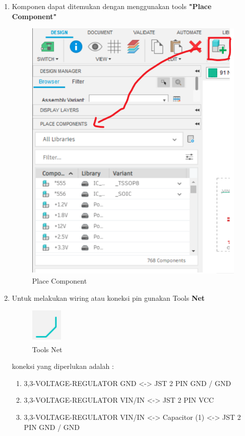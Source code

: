 \begin{enumerate}
    \vspace{5pt}
    \item Komponen dapat ditemukan dengan menggunakan tools \textbf{"Place Component"}
        \begin{figure}[H]
            \centering
            \includegraphics[width=0.7\linewidth]{P1/img/placecomponent.png}
            \caption{Place Component} 
            \label{fig:libraryfusion360}
        \end{figure}
    \item Untuk melakukan wiring atau koneksi pin gunakan Tools \textbf{Net} 
        \begin{figure}[H]
            \centering
            \includegraphics[width=0.2\linewidth]{P1/img/net.png}
            \caption{Tools Net} 
            \label{fig:toolsnet}
        \end{figure}
    koneksi yang diperlukan adalah :
    \begin{enumerate}
        \item 3,3-VOLTAGE-REGULATOR GND <-> JST 2 PIN GND / GND
        \item 3,3-VOLTAGE-REGULATOR VIN/IN <-> JST 2 PIN VCC
        \item 3,3-VOLTAGE-REGULATOR VIN/IN <-> Capacitor (1) <-> JST 2 PIN GND / GND

\end{enumerate}
\end{enumerate}
